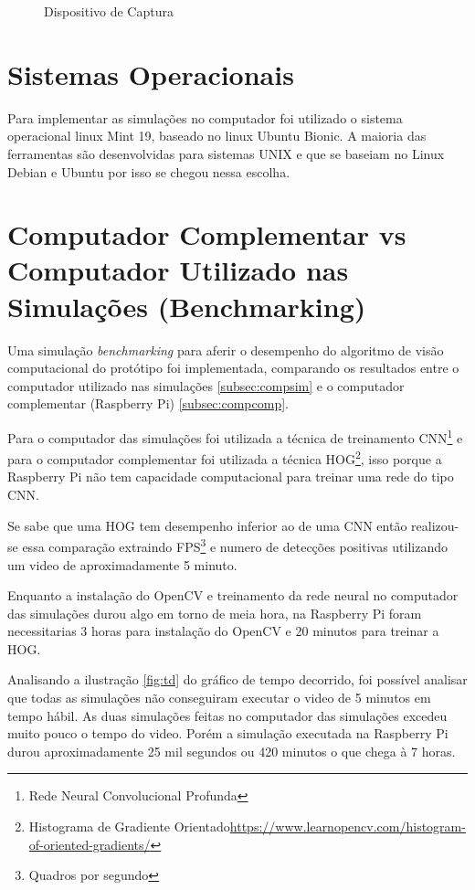 \begin{figure}[H]
	\centering	
	\caption{Dispositivo de Captura}
	\def\svgwidth{10cm}
	
	\label{fig:cam}
\end{figure}

\section{Sistemas Operacionais}

Para implementar as simulações no computador foi utilizado o sistema operacional linux Mint 19, baseado no linux Ubuntu Bionic.
A maioria das ferramentas são desenvolvidas para sistemas UNIX e que se baseiam no Linux Debian e Ubuntu por isso se chegou nessa escolha.



\section{Computador Complementar vs Computador Utilizado nas Simulações (Benchmarking)}
\label{subsec:bench}

Uma simulação \textit{benchmarking} para aferir o desempenho do algoritmo de visão computacional do protótipo foi implementada, comparando os resultados entre o computador utilizado nas simulações \ref{subsec:compsim} e o computador complementar (Raspberry Pi) \ref{subsec:compcomp}.

Para o computador das simulações foi utilizada a técnica de treinamento CNN\footnote{Rede Neural Convolucional Profunda} e para o computador complementar foi utilizada a técnica HOG\footnote{Histograma de Gradiente Orientado\url{https://www.learnopencv.com/histogram-of-oriented-gradients/}}, isso porque a Raspberry Pi não tem capacidade computacional para treinar uma rede do tipo CNN.

Se sabe que uma HOG tem desempenho inferior ao de uma CNN então realizou-se essa comparação extraindo FPS\footnote{Quadros por segundo} e numero de detecções positivas utilizando um video de aproximadamente 5 minuto.    

Enquanto a instalação do OpenCV e treinamento da rede neural no computador das simulações durou algo em torno de meia hora, na Raspberry Pi foram necessitarias 3 horas para instalação do OpenCV e 20 minutos para treinar a HOG.

Analisando a ilustração \ref{fig:td} do gráfico de tempo decorrido, foi possível analisar que todas as simulações não conseguiram executar o video de 5 minutos em tempo hábil. As duas simulações feitas no computador das simulações excedeu muito pouco o tempo do video. Porém a simulação executada na Raspberry Pi durou aproximadamente 25 mil segundos ou 420 minutos o que chega à 7 horas.    

